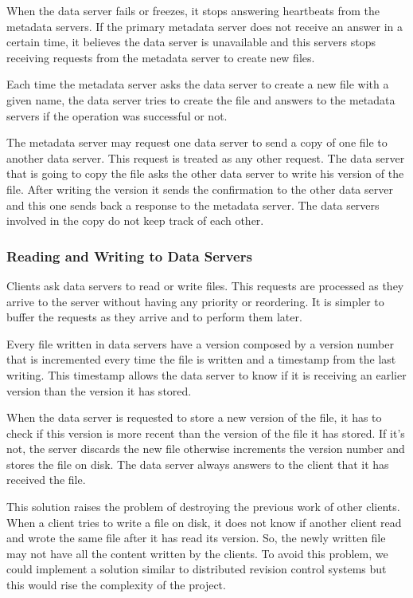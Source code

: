 When the data server fails or freezes, it stops answering heartbeats from
the metadata servers. If the primary metadata server does not receive an
answer in a certain time, it believes the data server is unavailable
and this servers stops receiving requests from the metadata server to
create new files.

Each time the metadata server asks the data server to create a new file
with a given name, the data server tries to create the file and answers
to the metadata servers if the operation was successful or not.

The metadata server may request one data server to send a copy of one file
to another data server. This request is treated as any other request.
The data server that is going to copy the file asks the other data server
to write his version of the file. After writing the version it sends the 
confirmation to the other data server and this one sends back a response 
to the metadata server.
The data servers involved in the copy do not keep track of each other.

\subsubsection{Reading and Writing to Data Servers}

Clients ask data servers to read or write files. This requests are
processed as they arrive to the server without having any priority or 
reordering. It is simpler to buffer the requests as they arrive and to
perform them later.

Every file written in data servers have a version composed by a version
number that is incremented every time the file is written and a timestamp
from the last writing. This timestamp allows the data server to know if it is
receiving an earlier version than the version it has stored.

When the data server is requested to store a new version of the file, it has 
to check if this version is more recent than the version of the file it has 
stored. If it's not, the server discards the new file otherwise increments 
the version number and stores the file on disk. The data server always answers
to the client that it has received the file.

This solution raises the problem of destroying the previous work of other 
clients. When a client tries to write a file on disk, it does not know if 
another client read and wrote the same file after it has read its version. 
So, the newly written file may not have all the content written by the 
clients. To avoid this problem, we could implement a solution similar to 
distributed revision control systems but this would rise the complexity 
of the project.